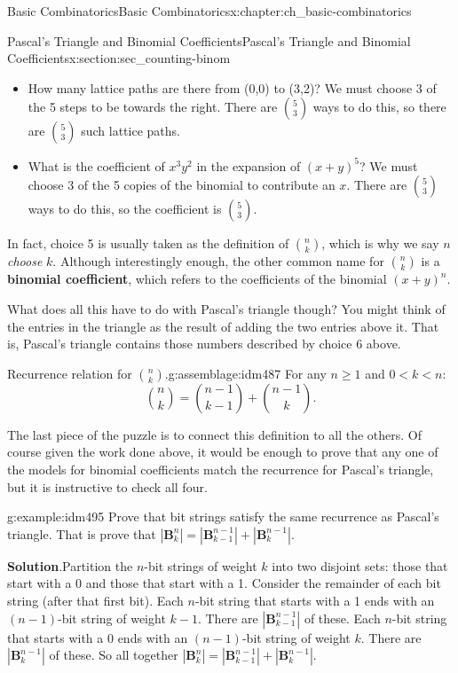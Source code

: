 \documentclass[oneside,10pt,]{book}
\newcommand{\terminology}[1]{\textbf{#1}}
\numberwithin{equation}{chapter}
\def\B{\mathbf{B}}
\newcommand{\lt}{<}
\begin{document}
\begin{chapterptx}{Basic Combinatorics}{}{Basic Combinatorics}{}{}{x:chapter:ch_basic-combinatorics}
\begin{sectionptx}{Pascal's Triangle and Binomial Coefficients}{}{Pascal's Triangle and Binomial Coefficients}{}{}{x:section:sec_counting-binom}
\begin{itemize}[label=\textbullet]
\item{}How many lattice paths are there from (0,0) to (3,2)?  We must choose 3 of the 5 steps to be towards the right.  There are \({5 \choose 3}\) ways to do this, so there are \({5 \choose 3}\) such lattice paths.%
\item{}What is the coefficient of \(x^3y^2\) in the expansion of \((x+y)^5\)?  We must choose 3 of the 5 copies of the binomial to contribute an \(x\).  There are \({5 \choose 3}\) ways to do this, so the coefficient is \({5 \choose 3}\).%
\end{itemize}
%
\par
In fact, choice 5 is usually taken as the definition of \(\binom{n}{k}\), which is why we say \(n\) \emph{choose} \(k\).  Although interestingly enough, the other common name for \(\binom{n}{k}\) is a \terminology{binomial coefficient}, which refers to the coefficients of the binomial \((x+y)^n\).%
\par
What does all this have to do with Pascal's triangle though?  You might think of the entries in the triangle as the result of adding the two entries above it.  That is, Pascal's triangle contains those numbers described by choice 6 above.%
\begin{assemblage}{Recurrence relation for \({n \choose k}\).}{g:assemblage:idm487}%
For any \(n \ge 1\) and \(0 \lt k \lt n\):%
\begin{equation*}
{n \choose k} = {n-1 \choose k-1} + {n-1 \choose k}.
\end{equation*}
%
\end{assemblage}
The last piece of the puzzle is to connect this definition to all the others.  Of course given the work done above, it would be enough to prove that any one of the models for binomial coefficients match the recurrence for Pascal's triangle, but it is instructive to check all four.%
\begin{example}{}{g:example:idm495}%
Prove that bit strings satisfy the same recurrence as Pascal's triangle.  That is prove that \(|\B^n_k| = |\B^{n-1}_{k-1}| + |\B^{n-1}_k|\).%
\par\smallskip%
\noindent\textbf{Solution}.\hypertarget{g:solution:idm499}{}\quad{}Partition the \(n\)-bit strings of weight \(k\) into two disjoint sets: those that start with a 0 and those that start with a 1.  Consider the remainder of each bit string (after that first bit). Each \(n\)-bit string that starts with a 1 ends with an \((n-1)\)-bit string of weight \(k-1\).  There are \(|\B^{n-1}_{k-1}|\) of these. Each \(n\)-bit string that starts with a 0 ends with an \((n-1)\)-bit string of weight \(k\).  There are \(|\B^{n-1}_k|\) of these.  So all together \(|\B^n_k| = |\B^{n-1}_{k-1}| + |\B^{n-1}_k|\).%

\end{example}
\end{sectionptx}
\end{chapterptx}
\end{document}
